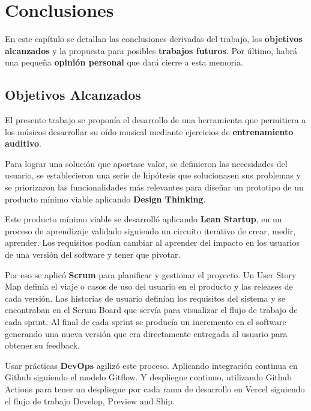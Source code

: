 \documentclass[12pt,twoside,titlepage]{report}
\begin{document}
{\newpage

\chapter{Conclusiones}

En este capítulo se detallan las conclusiones derivadas del trabajo, los \textbf{objetivos alcanzados} y la propuesta para posibles \textbf{trabajos futuros}. Por último, habrá una pequeña \textbf{opinión personal} que dará cierre a esta memoria.
\section{Objetivos Alcanzados}

El presente trabajo se proponía el desarrollo de una herramienta que permitiera a los músicos desarrollar su oído musical mediante ejercicios de \textbf{entrenamiento auditivo}.

Para lograr una solución que aportase valor, se definieron las necesidades del usuario, se establecieron una serie de hipótesis que solucionasen sus problemas y se priorizaron las funcionalidades más relevantes para diseñar un prototipo de un producto mínimo viable aplicando \textbf{Design Thinking}.

Este producto mínimo viable se desarrolló aplicando \textbf{Lean Startup}, en un proceso de aprendizaje validado siguiendo un circuito iterativo de crear, medir, aprender. Los requisitos podían cambiar al aprender del impacto en los usuarios de una versión del software y tener que pivotar.

Por eso se aplicó \textbf{Scrum} para planificar y gestionar el proyecto. Un User Story Map definía el viaje o casos de uso del usuario en el producto y las releases de cada versión. Las historias de usuario definían los requisitos del sistema y se encontraban en el Scrum Board que servía para visualizar el flujo de trabajo de cada sprint. Al final de cada sprint se producía un incremento en el software generando una nueva versión que era directamente entregada al usuario para obtener su feedback.

Usar prácticas \textbf{DevOps} agilizó este proceso. Aplicando integración continua en Github siguiendo el modelo Gitflow. Y despliegue continuo, utilizando Github Actions para tener un despliegue por cada rama de desarrollo en Vercel siguiendo el flujo de trabajo Develop, Preview and Ship.

}
\end{document}
